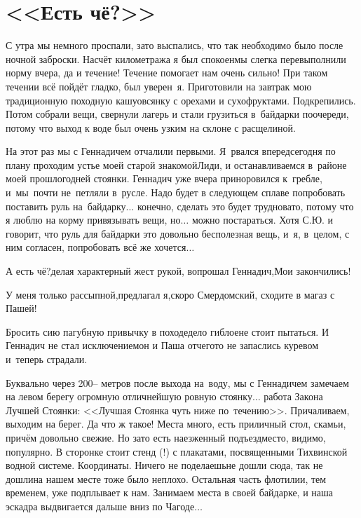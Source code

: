 \chapter{<<Есть чё?>>} 
\vepsianrose

С утра мы немного проспали, зато выспались, что так необходимо было после ночной заброски. Насчёт километража я был спокоен\mdash мы слегка перевыполнили норму вчера, да и течение! Течение помогает нам очень сильно! При таком течении всё пойдёт гладко, был уверен~я. Приготовили на завтрак мою традиционную походную кашу\mdash овсянку с орехами и сухофруктами. Подкрепились. Потом собрали вещи, свернули лагерь и стали грузиться в~байдарки по\sdash очереди, потому что выход к воде был очень узким на склоне с расщелиной. 

На этот раз мы с Геннадичем отчалили первыми. Я~рвался вперед\mdash  сегодня по плану проходим устье моей старой знакомой\mdash  Лиди, и останавливаемся в~районе моей прошлогодней стоянки. Геннадич уже вчера приноровился к~гребле, и~мы~почти не~петляли в~русле. Надо будет в следующем сплаве попробовать поставить руль на~байдарку$\ldots$ конечно, сделать это будет трудновато, потому что я люблю на корму привязывать вещи, но$\ldots$ можно постараться. Хотя С.Ю. и говорит, что руль для байдарки это довольно бесполезная вещь, и~я, в~целом, с ним согласен, попробовать всё же хочется$\ldots$ 

\diagdash А есть чё?\mdash делая характерный жест рукой, вопрошал Геннадич,\mdash Мои закончились!

\diagdash У меня только рассыпной,\mdash предлагал я,\mdash скоро Смердомский, сходите в магаз с Пашей!

Бросить сию пагубную привычку в походе\mdash дело гиблое\mdash не стоит пытаться. И Геннадич не стал исключением\mdash он и Паша отчего\sdash то не запаслись куревом и~теперь страдали.

Буквально через 200\thinspace\nobreakdash-- метров после выхода на~воду, мы с Геннадичем замечаем на левом берегу огромную отличнейшую ровную стоянку$\ldots$  работа Закона Лучшей Стоянки: <<Лучшая Стоянка чуть ниже по~течению>>. Причаливаем, выходим на берег. Да что ж такое! Места много, есть приличный стол, скамьи, причём довольно свежие. Но зато есть наезженный подъезд\mdash  место, видимо, популярно. В сторонке стоит стенд (!) с плакатами, посвященными Тихвинской водной системе. Координаты\mdash \CoordsChagodaGood. Ничего не поделаешь\mdash не дошли сюда, так не дошли\mdash на нашем месте тоже было неплохо. Остальная часть флотилии, тем временем, уже подплывает к нам. Занимаем места в своей байдарке, и наша эскадра выдвигается дальше вниз по Чагоде$\ldots$  


